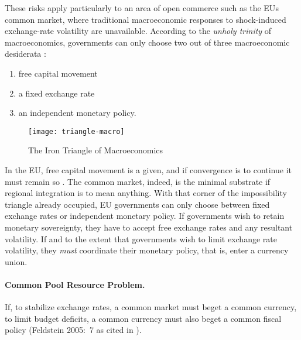 These risks apply particularly to an area of open commerce such as the \gls{EU}s common market, where traditional macroeconomic responses to shock-induced exchange-rate volatility are unavailable.
According to the \emph{unholy trinity} of macroeconomics, governments can only choose two out of three macroeconomic desiderata \citep{Mundell1963,Fleming1962}:
\begin{enumerate}
	\item free capital movement
	\item a fixed exchange rate
	\item an independent monetary policy.
\end{enumerate}

 \begin{figure}[htbp]
	\centering
	\texttt{[image: triangle-macro]}
	\caption{The Iron Triangle of Macroeconomics}
	\label{fig:triangle-macro}
\end{figure}

In the \gls{EU}, free capital movement is a given, and if convergence is to continue it must remain so \citep{Abiad2007}.
The common market, indeed, is the minimal substrate if regional integration is to mean anything.
With that corner of the impossibility triangle already occupied, \gls{EU} governments can only choose between fixed exchange rates or independent monetary policy.
If governments wish to retain monetary sovereignty, they have to accept free exchange rates and any resultant volatility.
If and to the extent that governments wish to limit exchange rate volatility, they \emph{must} coordinate their monetary policy, that is, enter a currency union.

\paragraph[Fiscal-CPR]{Common Pool Resource Problem.}
	\label{sec:Fiscal-CPR}
If, to stabilize exchange rates, a common market must beget a common currency, to limit budget deficits, a common currency must also beget a common fiscal policy (Feldstein 2005:~7 as cited in \citealt[13]{Begg2008}).


